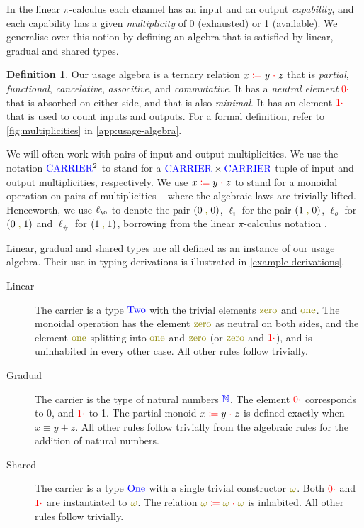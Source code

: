 \documentclass[a4paper,UKenglish,cleveref, autoref, thm-restate,authorcolumns]{lipics-v2019}
\theoremstyle{definition}
\newtheorem{nidefinition}[theorem]{Definition}
\newcommand{\picalc}{$\pi$-calculus}
\newcommand{\type}[1]{\textcolor{blue}{\operatorname{#1}}}
\newcommand{\constr}[1]{\textcolor{olive}{\operatorname{#1}}}
\newcommand{\field}[1]{\textcolor{red}{\operatorname{#1}}}
\newcommand{\comma}{\; \constr{,} \;}
\newcommand{\op}[3]{#1 \; \field{\coloneqq} \; #2 \; \field{\cdot} \; #3}
\newcommand{\zero}{\field{0\cdot}}
\newcommand{\one}{\field{1\cdot}}
\newcommand{\li}{\ell_i}
\newcommand{\lo}{\ell_o}
\newcommand{\lz}{\ell_{\o}}
\newcommand{\lio}{\ell_{\#}}
\newcommand{\Carrier}{\type{CARRIER}}
\newcommand{\N}{\type{\mathbb{N}}}
\begin{document}
In the linear \picalc{} each channel has an input and an output \emph{capability}, and each capability has a given \emph{multiplicity} of 0 (exhausted) or 1 (available).
We generalise over this notion by defining an algebra that is satisfied by linear, gradual and shared types.

\begin{nidefinition}
  Our usage algebra is a ternary relation $\op{x}{y}{z}$ that is \emph{partial}, \emph{functional}, \emph{cancelative}, \emph{associtive}, and \emph{commutative}.
  It has a \emph{neutral element} $\zero$ that is absorbed on either side, and that is also \emph{minimal}.
  It has an element $\one$ that is used to count inputs and outputs.
  For a formal definition, refer to \autoref{fig:multiplicities} in \autoref{app:usage-algebra}.
\end{nidefinition}

\begin{note}
  We will often work with pairs of input and output multiplicities.
  We use the notation $\Carrier^2$ to stand for a $\Carrier \times \Carrier$ tuple of input and output multiplicities, respectively.
  We use $\op{x}{y}{z}$ to stand for a monoidal operation on pairs of multiplicities -- where the algebraic laws are trivially lifted.
  Henceworth, we use $\lz$ to denote the pair $(0 \comma 0)$, $\li$ for the pair $(1 \comma 0)$, $\lo$ for $(0 \comma 1)$ and $\lio$ for $(1 \comma 1)$, borrowing from the linear \picalc{} notation \cite{KPT96,Sangio01}.
\end{note}

Linear, gradual and shared types are all defined as an instance of our usage algebra.
Their use in typing derivations is illustrated in \autoref{example-derivations}.

\begin{description}
  \item [Linear]
    The carrier is a type $\type{Two}$ with the trivial elements $\constr{zero}$ and $\constr{one}$.
    The monoidal operation has the element $\constr{zero}$ as neutral on both sides, and the element $\constr{one}$ splitting into $\constr{one}$ and $\constr{zero}$ (or $\constr{zero}$ and $\constr{\one}$), and is uninhabited in every other case.
    All other rules follow trivially.

    \item [Gradual]
    The carrier is the type of natural numbers $\N$.
    The element $\zero$ corresponds to 0, and $\one$ to 1.
    The partial monoid $\op{x}{y}{z}$ is defined exactly when $x \equiv y + z$.
    All other rules follow trivially from the algebraic rules for the addition of natural numbers.

    \item [Shared]
    The carrier is a type $\type{One}$ with a single trivial constructor $\constr{\omega}$.
    Both $\zero$ and $\one$ are instantiated to $\constr{\omega}$.
    The relation $\op{\constr{\omega}}{\constr{\omega}}{\constr{\omega}}$ is inhabited.
    All other rules follow trivially.
\end{description}
\end{document}
